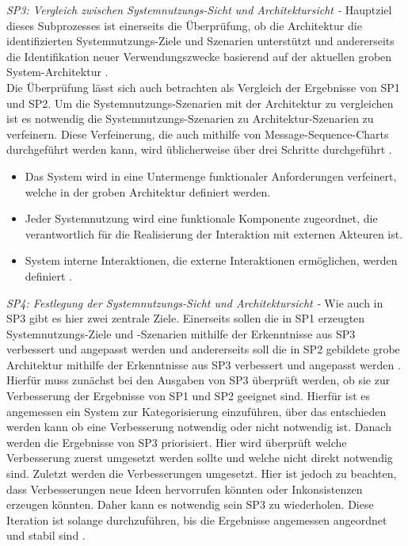\emph{SP3: Vergleich zwischen Systemnutzungs-Sicht und Architektursicht -}
Hauptziel dieses Subprozesses ist einerseits die \"Uberpr\"ufung, ob die Architektur die identifizierten Systemnutzungs-Ziele und Szenarien unterst\"utzt und andererseits die Identifikation neuer Verwendungszwecke basierend auf der aktuellen groben System-Architektur \cite{Poh01}.\\

Die \"Uberpr\"ufung l\"asst sich auch betrachten als Vergleich der Ergebnisse von SP1 und SP2. Um die Systemnutzungs-Szenarien mit der Architektur zu vergleichen ist es notwendig die Systemnutzungs-Szenarien zu Architektur-Szenarien zu verfeinern. Diese Verfeinerung, die auch mithilfe von Message-Sequence-Charts durchgef\"uhrt werden kann, wird \"ublicherweise \"uber drei Schritte durchgef\"uhrt \cite{Poh01}.\\

\begin{itemize}
\item Das System wird in eine Untermenge funktionaler Anforderungen verfeinert, welche in der groben Architektur definiert werden.
\item Jeder Systemnutzung wird eine funktionale Komponente zugeordnet, die verantwortlich f\"ur die Realisierung der Interaktion mit externen Akteuren ist. 
\item System interne Interaktionen, die externe Interaktionen erm\"oglichen, werden definiert \cite{Poh01}.\\
\end{itemize}

\emph{SP4: Festlegung der Systemnutzungs-Sicht und Architektursicht -}
Wie auch in SP3 gibt es hier zwei zentrale Ziele. Einerseits sollen die in SP1 erzeugten Systemnutzungs-Ziele und -Szenarien mithilfe der Erkenntnisse aus SP3 verbessert und angepasst werden und andererseits soll die in SP2 gebildete grobe Architektur mithilfe der Erkenntnisse aus SP3 verbessert und angepasst werden \cite{Poh01}.\\

Hierf\"ur muss zun\"achst bei den Ausgaben von SP3 \"uberpr\"uft werden, ob sie zur Verbesserung der Ergebnisse von SP1 und SP2 geeignet sind. Hierf\"ur ist es angemessen ein System zur Kategorisierung einzuf\"uhren, \"uber das entschieden werden kann ob eine Verbesserung notwendig oder nicht notwendig ist. Danach werden die Ergebnisse von SP3 priorisiert. Hier wird \"uberpr\"uft welche Verbesserung zuerst umgesetzt werden sollte und welche nicht direkt notwendig sind. Zuletzt werden die Verbesserungen umgesetzt. Hier ist jedoch zu beachten, dass Verbesserungen neue Ideen hervorrufen k\"onnten oder Inkonsistenzen erzeugen k\"onnten. Daher kann es notwendig sein SP3 zu wiederholen. Diese Iteration ist solange durchzuf\"uhren, bis die Ergebnisse angemessen angeordnet und stabil sind \cite{Poh01}.\\

